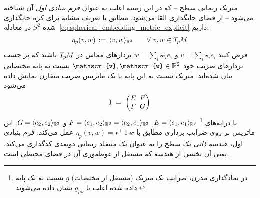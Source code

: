 متریک ریمانی سطح -- که در این زمینه اغلب به عنوان \emph{فرم بنیادی اول} آن شناخته می‌شود -- از فضای جایگذاری القا می‌شود.
مطابق با تعریف مشابه برای کره جایگذاری شده $S^2$ در معادله~\eqref{eq:spherical_embedding_metric_explicit} داریم:
\begin{align}\label{eq:surface_embedding_metric}
    \eta_p(v,w) \,:=\, \langle v,w \rangle_{\mathbb{R}^3} \qquad \forall\ v,w \in T_{\mkern-1.5mu p}\mkern-.5muM
\end{align}
فرض کنید $v = \sum_i \mathscr{v}_i e_i$ و $w = \sum_i \mathscr{w}_i e_i$ بردارهای مماس در $T_{\mkern-1.5mu p}\mkern-.5muM$ باشند که بر حسب بردارهای ضریب خود $\mathscr{v},\mathscr{w}\in\R^2$ نسبت به پایه مختصاتی بیان شده‌اند.
متریک نسبت به این پایه با یک ماتریس ضریب متقارن نمایش داده می‌شود
\begin{align}
    \operatorname{I}
    \ =\ 
    \begin{pmatrix}
        E \mkern-8mu& F \\
        F \mkern-8mu& G
    \end{pmatrix}
\end{align}
با درایه‌های%
\footnote{
    در نمادگذاری مدرن، ضرایب یک متریک (مستقل از مختصات) $g$ نسبت به یک پایه داده شده اغلب با $g_{\mu\nu}$ نشان داده می‌شوند.
}
$E = \langle e_1, e_1 \rangle_{\mathbb{R}^3}$,
$F = \langle e_1, e_2 \rangle_{\mathbb{R}^3}
    = \langle e_2, e_1 \rangle_{\mathbb{R}^3}$ و
$G = \langle e_2, e_2 \rangle_{\mathbb{R}^3}$.
این ماتریس بر روی ضرایب برداری مطابق با $\eta_p(v,w) = \mathscr{v}^\top \operatorname{I}\mathscr{w}$ عمل می‌کند.
فرم بنیادی اول، هندسه \emph{ذاتی} یک سطح را به عنوان یک منیفلد ریمانی دوبعدی کدگذاری می‌کند، یعنی آن بخشی از هندسه که مستقل از غوطه‌وری آن در فضای محیطی است.


